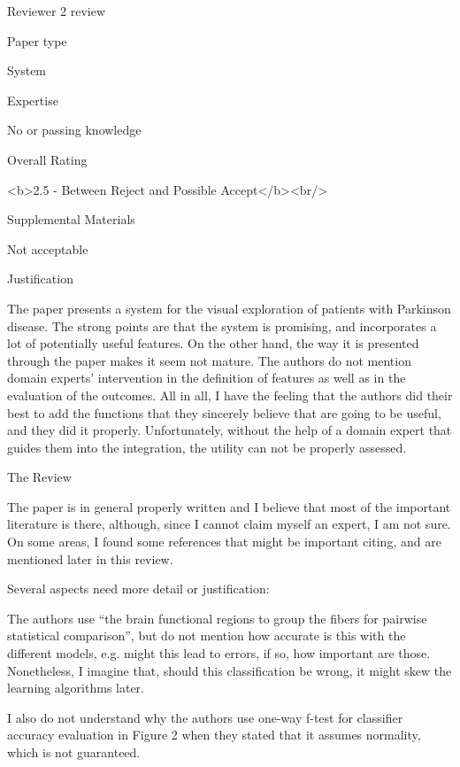 Reviewer 2 review

  Paper type

    System

  Expertise

    No or passing knowledge

  Overall Rating

    <b>2.5 - Between Reject and Possible Accept</b><br/>

  Supplemental Materials

    Not acceptable

  Justification

    The paper presents a system for the visual exploration of patients with Parkinson
    disease. The strong points are that the system is promising, and incorporates a
    lot of potentially useful features.
    On the other hand, the way it is presented through the paper makes it seem not
    mature. The authors do not mention domain experts' intervention in the definition
    of features as well as in the evaluation of the outcomes. All in all, I have the
    feeling that the authors did their best to add the functions that they sincerely
    believe that are going to be useful, and they did it properly. Unfortunately,
    without the help of a domain expert that guides them into the integration, the
    utility can not be properly assessed.

  The Review

    The paper is in general properly written and I believe that most of the important
    literature is there, although, since I cannot claim myself an expert, I am not
    sure. On some areas, I found some references that might be important citing, and
    are mentioned later in this review.

    Several aspects need more detail or justification:

    The authors use “the brain functional regions to group the fibers for pairwise
    statistical comparison”, but do not mention how accurate is this with the
    different models, e.g. might this lead to errors, if so, how important are those.
    Nonetheless, I imagine that, should this classification be wrong, it might skew
    the learning algorithms later.

    I also do not understand why the authors use one-way f-test for classifier
    accuracy evaluation in Figure 2 when they stated that it assumes normality, which
    is not guaranteed.

